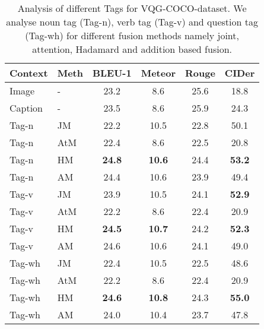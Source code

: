 \documentclass[11pt,a4paper]{article}
\begin{document}
\begin{table}[ht]
\scriptsize
\centering
\begin{tabular}{|l|l|cccc|}
\hline \bf Context & \bf Meth & \bf BLEU-1 & \bf Meteor & \bf Rouge & \bf CIDer \\ \hline 
Image & - & 23.2  &  8.6  & 25.6 & 18.8\\
Caption  &- & 23.5 & 8.6  & 25.9 & 24.3\\\hline
Tag-n & JM &22.2 &10.5 & 22.8 &50.1 \\
Tag-n & AtM & 22.4 &8.6 & 22.5 & 20.8\\
Tag-n & HM &\bf24.8&\bf10.6& 24.4 & \bf53.2\\
Tag-n & AM &24.4 &10.6& 23.9 & 49.4\\ \hline


Tag-v & JM & 23.9 &10.5  &24.1 &\bf52.9 \\
Tag-v & AtM & 22.2 &8.6 &22.4 &20.9\\
Tag-v & HM &\bf24.5 &\bf10.7&24.2 &\bf52.3 \\
Tag-v & AM & 24.6 &10.6 &24.1 &49.0\\ \hline


Tag-wh & JM &22.4  &10.5 &22.5 &48.6\\
Tag-wh & AtM &22.2  &8.6 &22.4 &20.9\\
Tag-wh & HM & \bf24.6 &\bf10.8& 24.3 & \textbf{55.0}\\
Tag-wh & AM &24.0  &10.4 &23.7 &47.8\\ \hline

\end{tabular}
\caption{\label{score_tab_7}  Analysis of different Tags for VQG-COCO-dataset. We analyse noun tag (Tag-n), verb tag (Tag-v) and question tag (Tag-wh) for different fusion methods namely joint, attention, Hadamard and addition based fusion.}
\end{table}
\end{document}
